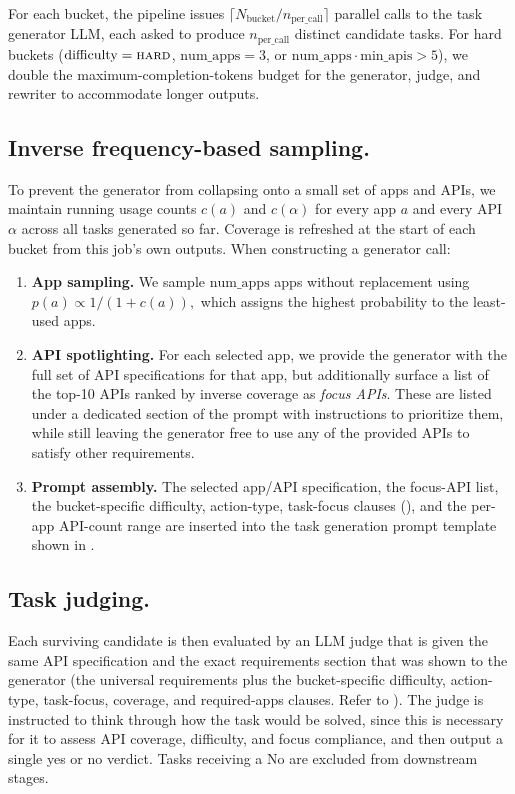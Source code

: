 For each bucket, the pipeline issues $\lceil N_{\text{bucket}}/n_{\text{per\_call}}\rceil$ parallel calls to the task generator LLM, each asked to produce $n_{\text{per\_call}}$ distinct candidate tasks. For
hard buckets ($\text{difficulty}=\textsc{hard}$, $\text{num\_apps}=3$, or $\text{num\_apps}\cdot\text{min\_apis}>5$), we double the maximum-completion-tokens budget for the generator, judge, and rewriter to accommodate longer outputs.

\subsection{Inverse frequency-based sampling.}
To prevent the generator from collapsing onto a small set of apps and APIs, we maintain running usage counts $c(a)$ and $c(\alpha)$ for every app $a$ and every API $\alpha$ across all tasks generated so far. Coverage is refreshed at the start of each bucket from this
job's own outputs. When constructing a generator call:
\begin{enumerate}[leftmargin=*,topsep=2pt,itemsep=2pt]
\item \textbf{App sampling.} We sample $\text{num\_apps}$ apps without replacement using
$p(a)\propto 1/(1+c(a)),$
which assigns the highest probability to the least-used apps.

\item \textbf{API spotlighting.} For each selected app, we provide the generator with the full set of API specifications for that app, but additionally surface a list of the top-10 APIs ranked by inverse coverage as \emph{focus APIs}. These are listed under a dedicated section of the prompt with instructions to prioritize them, while still leaving the generator free to use any of the provided APIs to satisfy other requirements.

\item \textbf{Prompt assembly.} The selected app/API specification, the focus-API list, the bucket-specific difficulty, action-type, task-focus clauses (), and the per-app API-count range are inserted into the task generation prompt template shown in .
\end{enumerate}


\subsection{Task judging.}
Each surviving candidate is then evaluated by an LLM judge that is given the same API specification and the exact requirements section that was shown to the generator (the universal requirements plus the bucket-specific difficulty, action-type, task-focus, coverage, and required-apps clauses. Refer to ). The judge is instructed to think through how the task would be solved, since this is necessary for it to assess API coverage, difficulty, and focus compliance, and then output a single yes or no verdict. Tasks receiving a No are excluded from downstream stages.

